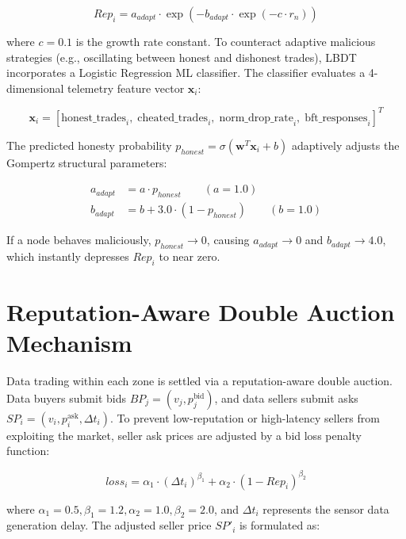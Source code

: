 \begin{equation}
Rep_i = a_{adapt} \cdot \exp\left( - b_{adapt} \cdot \exp\left( - c \cdot r_n \right) \right)
\end{equation}

\noindent where $c = 0.1$ is the growth rate constant. To counteract adaptive malicious strategies (e.g., oscillating between honest and dishonest trades), LBDT incorporates a Logistic Regression ML classifier. The classifier evaluates a 4-dimensional telemetry feature vector $\mathbf{x}_i$:

\begin{equation}
\mathbf{x}_i = \left[ \text{honest\_trades}_i, \; \text{cheated\_trades}_i, \; \text{norm\_drop\_rate}_i, \; \text{bft\_responses}_i \right]^T
\end{equation}

The predicted honesty probability $p_{honest} = \sigma(\mathbf{w}^T \mathbf{x}_i + b)$ adaptively adjusts the Gompertz structural parameters:

\begin{align}
a_{adapt} &= a \cdot p_{honest} \qquad (a = 1.0) \\
b_{adapt} &= b + 3.0 \cdot (1 - p_{honest}) \qquad (b = 1.0)
\end{align}

If a node behaves maliciously, $p_{honest} \to 0$, causing $a_{adapt} \to 0$ and $b_{adapt} \to 4.0$, which instantly depresses $Rep_i$ to near zero.

\section{Reputation-Aware Double Auction Mechanism}\label{sec:method_auction}
\noindent Data trading within each zone is settled via a reputation-aware double auction. Data buyers submit bids $BP_j = (v_j, p_j^{\text{bid}})$, and data sellers submit asks $SP_i = (v_i, p_i^{\text{ask}}, \Delta t_i)$. To prevent low-reputation or high-latency sellers from exploiting the market, seller ask prices are adjusted by a bid loss penalty function:

\begin{equation}
loss_i = \alpha_1 \cdot (\Delta t_i)^{\beta_1} + \alpha_2 \cdot (1 - Rep_i)^{\beta_2}
\end{equation}

\noindent where $\alpha_1 = 0.5, \beta_1 = 1.2, \alpha_2 = 1.0, \beta_2 = 2.0$, and $\Delta t_i$ represents the sensor data generation delay. The adjusted seller price $SP'_i$ is formulated as:

